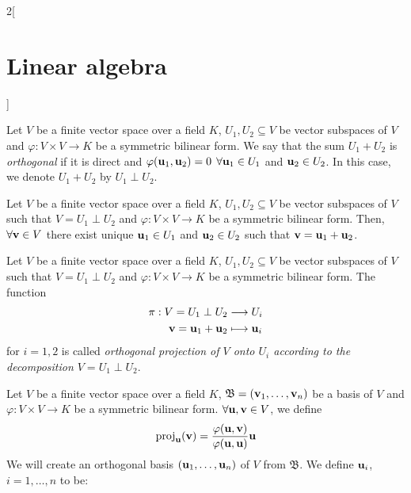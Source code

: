 \documentclass[../../../main.tex]{subfiles}
\begin{document}
\begin{multicols}{2}[\section{Linear algebra}]
    \begin{definition}
        Let $V$ be a finite vector space over a field $K$, $U_1,U_2\subseteq V$ be vector subspaces of $V$ and $\varphi:V\times V\rightarrow K$ be a symmetric bilinear form. We say that the sum $U_1+U_2$ is \textit{orthogonal} if it is direct and $\varphi(\boldsymbol{\mathrm{u}}_1,\boldsymbol{\mathrm{u}}_2)=0$ $\forall \boldsymbol{\mathrm{u}}_1\in U_1$ and $\boldsymbol{\mathrm{u}}_2\in U_2$. In this case, we denote $U_1+U_2$ by $U_1\perp U_2$.
    \end{definition}
    \begin{prop}
        Let $V$ be a finite vector space over a field $K$, $U_1,U_2\subseteq V$ be vector subspaces of $V$ such that $V=U_1\perp U_2$ and $\varphi:V\times V\rightarrow K$ be a symmetric bilinear form. Then, $\forall \boldsymbol{\mathrm{v}}\in V$ there exist unique $\boldsymbol{\mathrm{u}}_1\in U_1$ and $\boldsymbol{\mathrm{u}}_2\in U_2$ such that $\boldsymbol{\mathrm{v}}=\boldsymbol{\mathrm{u}}_1+\boldsymbol{\mathrm{u}}_2$.
    \end{prop}
    \begin{definition}\label{perpendicular}
        Let $V$ be a finite vector space over a field $K$, $U_1,U_2\subseteq V$ be vector subspaces of $V$ such that $V=U_1\perp U_2$ and $\varphi:V\times V\rightarrow K$ be a symmetric bilinear form. The function
        \begin{align*}
            \pi:V=U_1\perp U_2                                           & \longrightarrow U_i              \\
            \boldsymbol{\mathrm{v}}=\boldsymbol{\mathrm{u}}_1+\boldsymbol{\mathrm{u}}_2 & \longmapsto \boldsymbol{\mathrm{u}}_i
        \end{align*}
        for $i=1,2$ is called \textit{orthogonal projection of $V$ onto $U_i$ according to the decomposition $V=U_1\perp U_2$}.
    \end{definition}
    \begin{method}
        Let $V$ be a finite vector space over a field $K$, $\mathfrak{B}=(\boldsymbol{\mathrm{v}}_1,\ldots,\boldsymbol{\mathrm{v}}_n)$ be a basis of $V$ and $\varphi:V\times V\rightarrow K$ be a symmetric bilinear form. $\forall\boldsymbol{\mathrm{u}},\boldsymbol{\mathrm{v}}\in V$, we define $$\text{proj}_{\boldsymbol{\mathrm{u}}}(\boldsymbol{\mathrm{v}})=\frac{\varphi(\boldsymbol{\mathrm{u}},\boldsymbol{\mathrm{v}})}{\varphi(\boldsymbol{\mathrm{u}},\boldsymbol{\mathrm{u}})}\boldsymbol{\mathrm{u}}$$ We will create an orthogonal basis $(\boldsymbol{\mathrm{u}}_1,\ldots,\boldsymbol{\mathrm{u}}_n)$ of $V$ from $\mathfrak{B}$. We define $\boldsymbol{\mathrm{u}}_i$, $i=1,\ldots,n$ to be:

\end{method}
\end{multicols}
\end{document}
